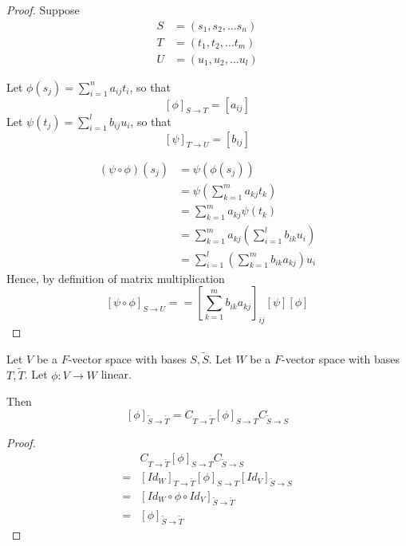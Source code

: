 \begin{proof}
    Suppose 
    \begin{align*}
        S &= \left( s_1, s_2, \hdots s_n \right)  \\
        T &= \left( t_1, t_2, \hdots t_m \right)  \\
        U &= \left( u_1, u_2, \hdots u_l \right)
    \end{align*}

    Let $\phi(s_j) = \sum\limits_{i=1}^{n} a_{ij} t_i $, so that 
    \[
        \left[ \phi \right]_{S \to T} = \left[ a_{ij} \right] 
    \]
    Let $\psi(t_j) = \sum\limits_{i = 1}^{l} b_{ij} u_i$, so that 
    \[
        \left[ \psi \right]_{T \to U} = \left[ b_{ij} \right] 
    \]

    \begin{align*}
        \left( \psi \circ \phi \right) (s_j) &= \psi \left( \phi(s_j) \right)  \\
        &= \psi \left( \sum\limits_{k = 1}^{m} a_{kj} t_k  \right)  \\
        &= \sum\limits_{k = 1}^{m}  a_{kj} \psi \left( t_k \right)  \\
        &= \sum\limits_{k= 1}^{m}  a_{kj} \left( \sum\limits_{i = 1}^{l}  b_{ik} u_i\right)  \\
        &= \sum\limits_{i = 1}^{l} \left( \sum\limits_{k = 1}^{m} b_{ik} a_{kj} \right) u_i
    \end{align*} 
    Hence, by definition of matrix multiplication
    \[
        \left[ \psi \circ \phi \right]_{S \to U} = = \left[ \sum\limits_{k = 1}^{m} b_{ik} a_{kj}\right]_{ij}  \left[ \psi \right] \left[ \phi \right] 
    \]
\end{proof}

\begin{corollary}
    Let $V$ be a $F$-vector space with bases $S, \tilde{S}$. Let $W$ be a $F$-vector space with bases $T, \tilde{T}$. Let $\phi : V \to W$ linear.  

    Then 
    \[
        \left[ \phi \right]_{\tilde{S} \to \tilde{T}} = C_{T \to \tilde{T}} \left[ \phi \right]_{S \to T} C_{ \tilde{S} \to S}
    \]
\end{corollary}

\begin{proof}
    \begin{align*}
        & C_{T \to \tilde{T}} \left[ \phi \right]_{S \to T} C_{\tilde{S} \to S} \\
        =& \left[ Id_W \right]_{T \to \tilde{T}} \left[ \phi \right]_{S \to T} \left[ Id_V \right]_{\tilde{S} \to S} \\
        =& \left[ Id_W \circ \phi \circ Id_V \right]_{\tilde{S} \to \tilde{T}} \\
        =& \left[ \phi \right]_{\tilde{S} \to \tilde{T}}
    \end{align*}
\end{proof}

